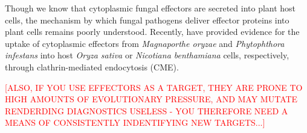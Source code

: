 Though we know that cytoplasmic fungal effectors are secreted into plant host cells, the mechanism by which fungal pathogens deliver effector proteins into plant cells remains poorly understood. Recently, \textcite{Oliveira-Garcia2023, Wang2023} have provided evidence for the uptake of cytoplasmic effectors from \textit{Magnaporthe oryzae} and \textit{Phytophthora infestans} into host \textit{Oryza sativa} or \textit{Nicotiana benthamiana} cells, respectively, through clathrin-mediated endocytosis (CME).  

\textcolor{red}{[ALSO, IF YOU USE EFFECTORS AS A TARGET, THEY ARE PRONE TO HIGH AMOUNTS OF EVOLUTIONARY PRESSURE, AND MAY MUTATE RENDERDING DIAGNOSTICS USELESS - YOU THEREFORE NEED A MEANS OF CONSISTENTLY INDENTIFYING NEW TARGETS...]}
